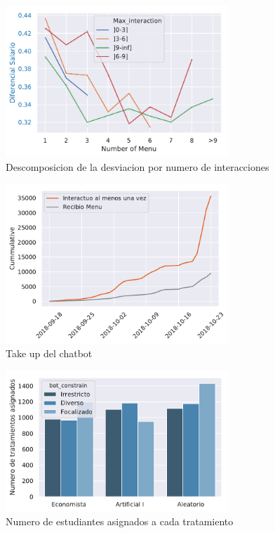 \documentclass[12pt]{article}
\begin{document}
\begin{figure}[h]
\caption{Descomposicion de la desviacion por numero de interacciones}
\centering
\includegraphics[width=0.75\textwidth]{Wage_deviation_decomposition.pdf}
\end{figure}


\begin{figure}[h]
\caption{Take up del chatbot}
\centering
\includegraphics[width=0.75\textwidth]{Takeup_levels.pdf}
\end{figure}


\begin{figure}[h]
\caption{Numero de estudiantes asignados a cada tratamiento}
\centering
\includegraphics[width=0.75\textwidth]{Treatments_assigned.pdf}
\end{figure}
\end{document}
